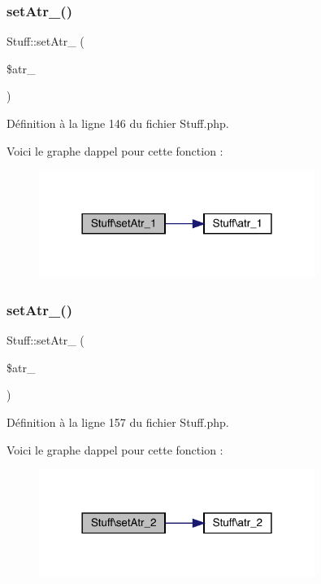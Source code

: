 \subsubsection{\texorpdfstring{set\+Atr\+\_()}{setAtr\_1()}}
{\footnotesize\ttfamily Stuff\+::set\+Atr\+\_ (\begin{DoxyParamCaption}\item[{}]{\$atr\+\_ }\end{DoxyParamCaption})}



Définition à la ligne 146 du fichier Stuff.\+php.

Voici le graphe d\textquotesingle{}appel pour cette fonction \+:\nopagebreak
\begin{figure}[H]
\begin{center}
\leavevmode
\includegraphics[width=254pt]{class_stuff_a87e45b3acdcbf5190778daefa47d877e_cgraph}
\end{center}
\end{figure}
\mbox{\label{class_stuff_acdb2a46068bf1f19aca527a971667cbe}} 
\subsubsection{\texorpdfstring{set\+Atr\+\_()}{setAtr\_2()}}
{\footnotesize\ttfamily Stuff\+::set\+Atr\+\_ (\begin{DoxyParamCaption}\item[{}]{\$atr\+\_ }\end{DoxyParamCaption})}



Définition à la ligne 157 du fichier Stuff.\+php.

Voici le graphe d\textquotesingle{}appel pour cette fonction \+:\nopagebreak
\begin{figure}[H]
\begin{center}
\leavevmode
\includegraphics[width=254pt]{class_stuff_acdb2a46068bf1f19aca527a971667cbe_cgraph}
\end{center}
\end{figure}
\mbox{\label{class_stuff_ae2d819b501f4b8bd815e6318549f42fa}} 
